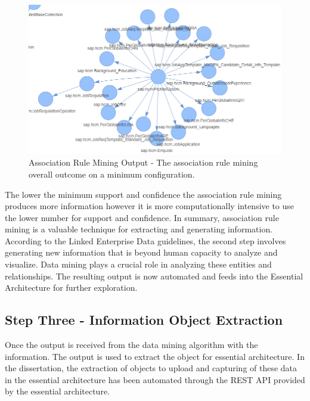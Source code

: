 \documentclass{article}
\begin{document}
\begin{figure}[ht!]
    \centering
    \includegraphics[scale=0.5]{ar-min-output}
    \caption{Association Rule Mining Output - 
The association rule mining overall outcome on a minimum configuration.}
    \label{fig:ea-ar}
\end{figure}

The lower the minimum support and confidence the association rule mining produces more information however it is more computationally intensive to use the lower number for support and confidence.
In summary, association rule mining is a valuable technique for extracting and generating information. According to the Linked Enterprise Data guidelines, the second step involves generating new information that is beyond human capacity to analyze and visualize. Data mining plays a crucial role in analyzing these entities and relationships. The resulting output is now automated and feeds into the Essential Architecture for further exploration.

\maketitle
\subsection{Step Three - Information Object Extraction}

Once the output is received from the data mining algorithm with the information. The output is used to extract the object for essential architecture. In the dissertation, the extraction of objects to upload and capturing of these data in the essential architecture has been automated through the REST API provided by the essential architecture.
\end{document}
